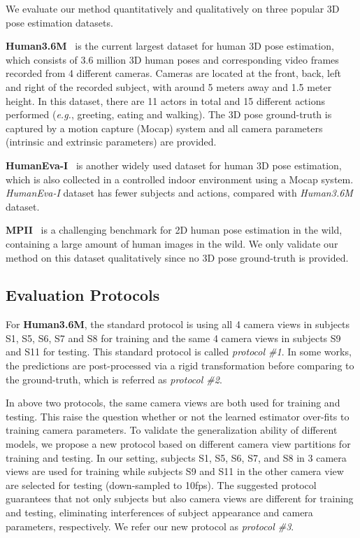 \documentclass[letterpaper]{article} \usepackage{aaai18}  \usepackage{times}  \usepackage{helvet}  \usepackage{courier}  \usepackage{url}  \usepackage{color}
\begin{document}
We evaluate our method quantitatively and qualitatively on three popular 3D pose estimation datasets.

\textbf{Human3.6M}~\cite{ionescu2014human3} is the current largest dataset for human 3D pose estimation, which consists of 3.6 million 3D human poses and corresponding video frames recorded from 4 different cameras. Cameras are located at the front, back, left and right of the recorded subject, with around 5 meters away and 1.5 meter height. In this dataset, there are 11 actors in total and 15 different actions performed (\textit{e.g.}, greeting, eating and walking). The 3D pose ground-truth is captured by a motion capture (Mocap) system and all camera parameters (intrinsic and extrinsic parameters) are provided.

\textbf{HumanEva-I}~\cite{sigal2010humaneva} is another widely used dataset for human 3D pose estimation, which is also collected in a controlled indoor environment using a Mocap system. \textit{HumanEva-I} dataset has fewer subjects and actions, compared with \textit{Human3.6M} dataset.

\textbf{MPII}~\cite{andriluka20142d} is a challenging benchmark for 2D human pose estimation in the wild, containing a large amount of human images in the wild. We only validate our method on this dataset qualitatively since no 3D pose ground-truth is provided.

\subsection{Evaluation Protocols}

For \textbf{Human3.6M}, the standard protocol is using all 4 camera views in subjects S1, S5, S6, S7 and S8 for training and the same 4 camera views in subjects S9 and S11 for testing. This standard protocol is called \textit{protocol \#1}. In some works, the predictions are post-processed via a rigid transformation before comparing to the ground-truth, which is referred as \textit{protocol \#2}.

In above two protocols, the same  camera views are both used for training and testing. This raise the question whether or not the learned estimator over-fits to training camera parameters. To validate the generalization ability of different models, we propose a new protocol based on different camera view partitions for training and testing. In our setting, subjects S1, S5, S6, S7, and S8 in 3 camera views are used for training while subjects S9 and S11 in the other camera view are selected for testing (down-sampled to 10fps). The suggested protocol guarantees that not only subjects but also camera views are different for training and testing, eliminating interferences of subject appearance and camera parameters, respectively. We refer our new protocol as \textit{protocol \#3}.
\end{document}
